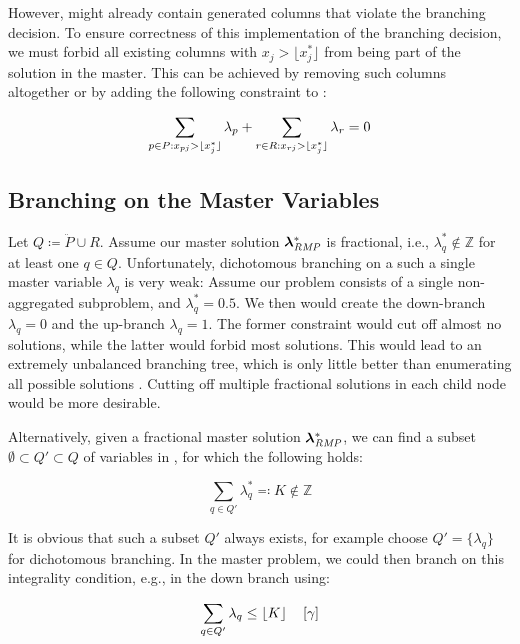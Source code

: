 However, \RMP{} might already contain generated columns that violate the branching decision. To ensure correctness of this implementation of the branching decision, we must forbid all existing columns with $x_j > \lfloor x_j^* \rfloor$ from being part of the solution in the master. This can be achieved by removing such columns altogether or by adding the following constraint to \MP{}:

\begin{equation}
\sum_{p \in P: x_{pj} > \lfloor x_j^*\rfloor} \lambda_p + \sum_{r \in R: x_{rj} > \lfloor x_j^*\rfloor} \lambda_r = 0
\end{equation}

\subsection{Branching on the Master Variables}\label{sec:cg_bp_bp_branching_master}
Let $Q \coloneqq \ddot{P} \cup R$. Assume our master solution ${\bm{\lambda}}^*_{\textit{RMP}}{}$ is fractional, i.e., $\lambda_q^* \not\in \mathbb{Z}$ for at least one $q \in Q$. Unfortunately, dichotomous branching on a such a single master variable $\lambda_q$ is very weak: Assume our problem consists of a single non-aggregated subproblem, and $\lambda_q^* = 0.5$. We then would create the down-branch $\lambda_q = 0$ and the up-branch $\lambda_q = 1$. The former constraint would cut off almost no solutions, while the latter would forbid most solutions. This would lead to an extremely unbalanced branching tree, which is only little better than enumerating all possible solutions \cite{thebook}. Cutting off multiple fractional solutions in each child node would be more desirable.

Alternatively, given a fractional master solution ${\bm{\lambda}}^*_{\textit{RMP}}{}$, we can find a subset $\emptyset \subset Q' \subset Q$ of variables in \RMP{}, for which the following holds:

\begin{equation}
\sum_{q \in Q'} \lambda_q^* \eqqcolon K \not\in \mathbb{Z}
\end{equation}

It is obvious that such a subset $Q'$ always exists, for example choose $Q' = \{\lambda_q\}$ for dichotomous branching. In the master problem, we could then branch on this integrality condition, e.g., in the down branch using:

\begin{equation}
\sum_{q \in Q'} \lambda_q \leq \lfloor K\rfloor \quad \left[\gamma\right]
\end{equation}

